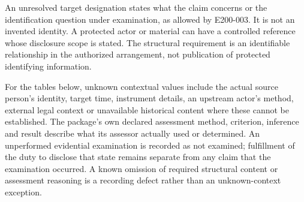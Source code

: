 \documentclass[11pt,a4paper]{article}
\begin{document}
An unresolved target designation states what the claim concerns or the identification question under examination, as allowed by E200-003. It is not an invented identity. A protected actor or material can have a controlled reference whose disclosure scope is stated. The structural requirement is an identifiable relationship in the authorized arrangement, not publication of protected identifying information.

For the tables below, unknown contextual values include the actual source person's identity, target time, instrument details, an upstream actor's method, external legal context or unavailable historical content where these cannot be established. The package's own declared assessment method, criterion, inference and result describe what its assessor actually used or determined. An unperformed evidential examination is recorded as not examined; fulfillment of the duty to disclose that state remains separate from any claim that the examination occurred. A known omission of required structural content or assessment reasoning is a recording defect rather than an unknown-context exception.
\end{document}

